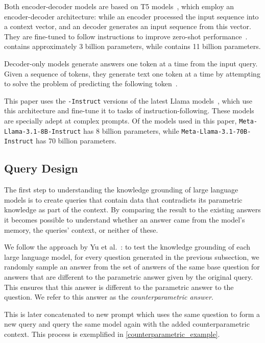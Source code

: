 Both encoder-decoder models are based on T5 models~\cite{t5}, which employ an encoder-decoder architecture: while an encoder processed the input sequence into a context vector, and an decoder generates an input sequence from this vector.
They are fine-tuned to follow instructions to improve zero-shot performance~\cite{flant5}.
\smallflan{} contains approximately 3 billion parameters, while \bigflan{} contains 11 billion parameters.

Decoder-only models generate answers one token at a time from the input query.
Given a sequence of tokens, they generate text one token at a time by attempting to solve the problem of predicting the following token~\cite{gpt}.

This paper uses the \texttt{-Instruct} versions of the latest Llama models~\cite{llama3}, which use this architecture and fine-tune it to tasks of instruction-following.
These models are specially adept at complex prompts.
Of the models used in this paper, \texttt{Meta-Llama-3.1-8B-Instruct} has 8 billion parameters, while \texttt{Meta-Llama-3.1-70B-Instruct} has 70 billion parameters.

\subsection{Query Design}
\label{query_design}

The first step to understanding the knowledge grounding of large language models is to create queries that contain data that contradicts its parametric knowledge as part of the context.
By comparing the result to the existing answers it becomes possible to understand whether an answer came from the model's memory, the queries' context, or neither of these.

We follow the approach by Yu et al.~\cite{factual_recall}: to test the knowledge grounding of each large language model, for every question generated in the previous subsection, we randomly sample an answer from the set of answers of the same base question for answers that are different to the parametric answer given by the original query.
This ensures that this answer is different to the parametric answer to the question.
We refer to this answer as the \emph{counterparametric answer}.

This is later concatenated to new prompt which uses the same question to form a new query and query the same model again with the added counterparametric context.
This process is exemplified in \cref{counterparametric_example}.

